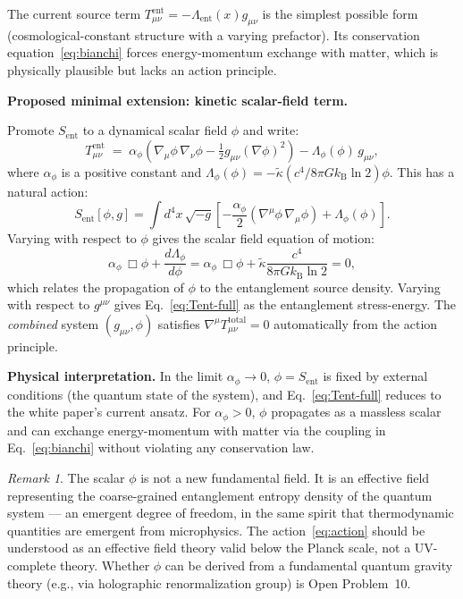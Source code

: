 \documentclass[12pt,letterpaper]{article}
\theoremstyle{plain}
\theoremstyle{definition}
\theoremstyle{remark}
\newtheorem{remark}[theorem]{Remark}
\newcommand{\kB}{k_{\mathrm{B}}}
\newcommand{\kt}{\tilde{\kappa}}
\newcommand{\Sent}{S_{\mathrm{ent}}}
\begin{document}
The current source term $T^{\mathrm{ent}}_{\mu\nu} = -\Lambda_{\mathrm{ent}}(x)g_{\mu\nu}$
is the simplest possible form (cosmological-constant structure with a varying prefactor).
Its conservation equation~\eqref{eq:bianchi} forces energy-momentum exchange with matter,
which is physically plausible but lacks an action principle.

\textbf{Proposed minimal extension: kinetic scalar-field term.}

Promote $\Sent$ to a dynamical scalar field $\phi$ and write:
\begin{equation}
  T^{\mathrm{ent}}_{\mu\nu}
  \;=\;
  \alpha_\phi\!\left(\nabla_\mu\phi\,\nabla_\nu\phi
  - \tfrac{1}{2}g_{\mu\nu}(\nabla\phi)^2\right)
  - \Lambda_\phi(\phi)\,g_{\mu\nu},
  \label{eq:Tent-full}
\end{equation}
where $\alpha_\phi$ is a positive constant and $\Lambda_\phi(\phi) = -\kt(c^4/8\pi G\kB\ln 2)\phi$.
This has a natural action:
\begin{equation}
  S_{\mathrm{ent}}[\phi,g]
  = \int d^4x\,\sqrt{-g}
    \left[
      -\frac{\alpha_\phi}{2}(\nabla^\mu\phi\,\nabla_\mu\phi)
      + \Lambda_\phi(\phi)
    \right].
  \label{eq:action}
\end{equation}
Varying with respect to $\phi$ gives the scalar field equation of motion:
\begin{equation}
  \alpha_\phi\,\Box\phi + \frac{d\Lambda_\phi}{d\phi}
  = \alpha_\phi\,\Box\phi + \kt\frac{c^4}{8\pi G\kB\ln 2}
  = 0,
  \label{eq:phi-eom}
\end{equation}
which relates the propagation of $\phi$ to the entanglement source density.
Varying with respect to $g^{\mu\nu}$ gives Eq.~\eqref{eq:Tent-full} as the entanglement
stress-energy.  The \emph{combined} system $(g_{\mu\nu}, \phi)$ satisfies
$\nabla^\mu T^{\mathrm{total}}_{\mu\nu} = 0$ automatically from the action principle.

\textbf{Physical interpretation.}  In the limit $\alpha_\phi \to 0$, $\phi = \Sent$ is fixed
by external conditions (the quantum state of the system), and Eq.~\eqref{eq:Tent-full}
reduces to the white paper's current ansatz.  For $\alpha_\phi > 0$, $\phi$ propagates as a
massless scalar and can exchange energy-momentum with matter via the coupling in
Eq.~\eqref{eq:bianchi} without violating any conservation law.

\begin{remark}
The scalar $\phi$ is not a new fundamental field.  It is an effective field representing the
coarse-grained entanglement entropy density of the quantum system --- an emergent degree of
freedom, in the same spirit that thermodynamic quantities are emergent from microphysics.
The action~\eqref{eq:action} should be understood as an effective field theory valid below
the Planck scale, not a UV-complete theory.  Whether $\phi$ can be derived from a fundamental
quantum gravity theory (e.g., via holographic renormalization group) is Open Problem~10.
\end{remark}
\end{document}
